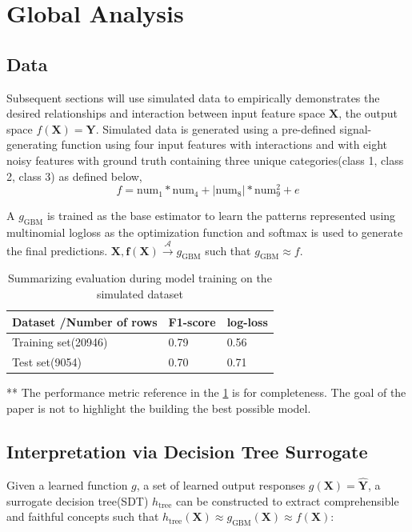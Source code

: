 \documentclass{article}
\begin{document}

\section{Global Analysis}

\subsection{Data}
Subsequent sections will use simulated data to empirically demonstrates the desired relationships and interaction between input feature space $\mathbf{X}$, the output space $f(\mathbf{X}) = \mathbf{Y}$. Simulated data is generated using a pre-defined signal-generating function using four input features with interactions and with eight noisy features with ground truth containing three unique categories(class 1, class 2, class 3) as defined below,
\begin{equation}
\label{eq:f}
f = \text{num} _1 * \text{num}_4 + |\text{num}_8| * \text{num}_9^2 + e
\end{equation}

A $g_{\text{GBM}}$ is trained as the base estimator to learn the patterns represented using multinomial logloss as the optimization function and softmax is used to generate the final predictions. 
$ \mathbf{X}, \mathbf{f(X)} \xrightarrow{\mathcal{A}} g_{\text{GBM}}$ such that $g_{\text{GBM}} \approx f$. 

\begin{table}[H]
  \caption{Summarizing evaluation during model training on the simulated dataset}
  \label{eval-table}
  \centering
  \begin{tabular}{lll}
    \toprule
    \cmidrule{1-2}
    Dataset /Number of rows    & F1-score     & log-loss  \\
    \midrule
    Training set(20946) &  0.79 & 0.56     \\
    Test set(9054)     &  0.70 & 0.71      \\
    \bottomrule
  \end{tabular}
\end{table}
** The performance metric reference in the \ref{eval-table} is for completeness. The goal of the paper is not to highlight the building the best possible model.

\subsection{Interpretation via Decision Tree Surrogate} \label{sec:surrogate_dt}
Given a learned function $g$, a set of learned output responses $g(\mathbf{X}) = \mathbf{\hat{Y}}$, a surrogate decision tree(SDT) $h_{\text{tree}}$ can be constructed to extract comprehensible and faithful concepts such that $h_{\text{tree}}(\mathbf{X}) \approx g_{\text{GBM}}(\mathbf{X}) \approx f(\mathbf{X})$:
\end{document}
